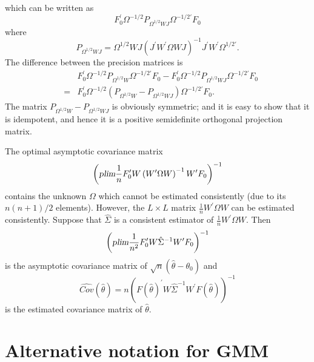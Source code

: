 \documentclass{article}
\begin{document}
which can be written as%
\begin{equation*}
F_{0}^{\prime }\Omega ^{-1/2}P_{\Omega ^{1/2}WJ}\Omega ^{-1/2\prime }F_{0}
\end{equation*}%
where
\begin{equation*}
P_{\Omega ^{1/2}WJ}=\Omega ^{1/2}WJ\left( J^{\prime }W^{\prime }\Omega
WJ\right) ^{-1}J^{\prime }W^{\prime }\Omega ^{1/2\prime }.
\end{equation*}%
The difference between the precision matrices is%
\begin{eqnarray*}
&&F_{0}^{\prime }\Omega ^{-1/2}P_{\Omega ^{1/2}W}\Omega ^{-1/2\prime
}F_{0}-F_{0}^{\prime }\Omega ^{-1/2}P_{\Omega ^{1/2}WJ}\Omega ^{-1/2\prime
}F_{0} \\
&=&F_{0}^{\prime }\Omega ^{-1/2}\left( P_{\Omega ^{1/2}W}-P_{\Omega
^{1/2}WJ}\right) \Omega ^{-1/2\prime }F_{0}.
\end{eqnarray*}%
The matrix $P_{\Omega ^{1/2}W}-P_{\Omega ^{1/2}WJ}$ is obviously symmetric;
and it is easy to show that it is idempotent, and hence it is a positive
semidefinite orthogonal projection matrix.

The optimal asymptotic covariance matrix%
\begin{equation*}
\left( \textsl{plim}\frac{1}{n}F_{0}^{\prime }W\left( W^{\prime }\Omega
W\right) ^{-1}W^{\prime }F_{0}\right) ^{-1}
\end{equation*}%
contains the unknown $\Omega $ which cannot be estimated consistently (due
to its $n(n+1)/2$ elements). However, the $L\times L$ matrix $\frac{1}{n}%
W^{\prime }\Omega W$ can be estimated consistently. Suppose that $\hat{\Sigma%
}$ is a consistent estimator of $\frac{1}{n}W^{\prime }\Omega W$. Then%
\begin{equation*}
\left( \textsl{plim}\frac{1}{n^{2}}F_{0}^{\prime }W\hat{\Sigma}%
^{-1}W^{\prime }F_{0}\right) ^{-1}
\end{equation*}%
is the asymptotic covariance matrix of $\sqrt{n}(\hat{\theta}-\theta _{0})$
and%
\begin{equation*}
\widehat{Cov}(\hat{\theta})=n\left( F(\hat{\theta})^{\prime }W\hat{\Sigma}%
^{-1}W^{\prime }F(\hat{\theta})\right) ^{-1}
\end{equation*}%
is the estimated covariance matrix of $\hat{\theta}$.

\section{Alternative notation for GMM}
\end{document}
